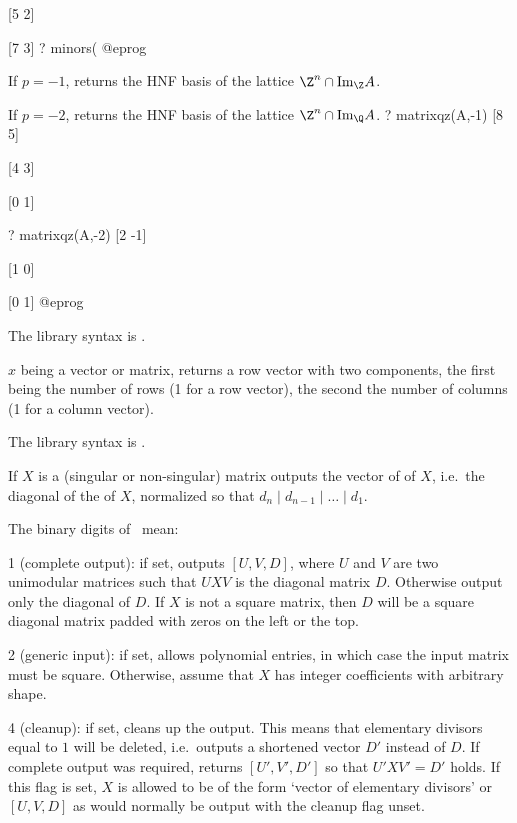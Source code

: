 [5 2]

[7 3]
? minors(%
@eprog

If $p=-1$, returns the HNF basis of the lattice $\Z^n \cap \text{Im}_\Z A$.

If $p=-2$, returns the HNF basis of the lattice $\Z^n \cap \text{Im}_\Q A$.
\bprog
? matrixqz(A,-1)
[8 5]

[4 3]

[0 1]

? matrixqz(A,-2)
[2 -1]

[1 0]

[0 1]
@eprog

The library syntax is .

\label{se:matsize}
$x$ being a vector or matrix, returns a row vector
with two components, the first being the number of rows (1 for a row vector),
the second the number of columns (1 for a column vector).

The library syntax is .

\label{se:matsnf}
If $X$ is a (singular or non-singular) matrix outputs the vector of
 of $X$, i.e.~the diagonal of the
 of $X$, normalized so that $d_n \mid d_{n-1} \mid
\ldots \mid d_1$.

The binary digits of \fl\ mean:

1 (complete output): if set, outputs $[U,V,D]$, where $U$ and $V$ are two
unimodular matrices such that $UXV$ is the diagonal matrix $D$. Otherwise
output only the diagonal of $D$. If $X$ is not a square matrix, then $D$
will be a square diagonal matrix padded with zeros on the left or the top.

2 (generic input): if set, allows polynomial entries, in which case the
input matrix must be square. Otherwise, assume that $X$ has integer
coefficients with arbitrary shape.

4 (cleanup): if set, cleans up the output. This means that elementary
divisors equal to $1$ will be deleted, i.e.~outputs a shortened vector $D'$
instead of $D$. If complete output was required, returns $[U',V',D']$ so
that $U'XV' = D'$ holds. If this flag is set, $X$ is allowed to be of the
form `vector of elementary divisors' or $[U,V,D]$ as would normally be output with the cleanup flag
unset.

